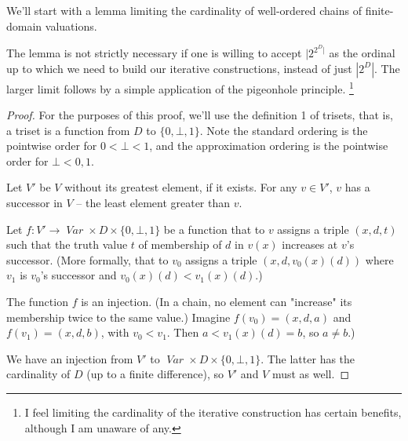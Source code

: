 \documentclass[oneside,12pt]{book}
\theoremstyle{definition}
\theoremstyle{remark}
\newcommand\var[1]{\mathop{\mathit{#1}}\nolimits}
\newcommand{\Var}{\var{Var}}
\begin{document}
We'll start with a lemma limiting the cardinality of well-ordered chains
of finite-domain valuations.

The lemma is not strictly necessary if one is willing to accept $|2^{2^D|}$
as the ordinal up to which we need to build our iterative constructions,
instead of just $|2^D|$. The larger limit follows by a simple application
of the pigeonhole principle.%
\footnote{I feel limiting the cardinality of the iterative construction
has certain benefits, although I am unaware of any.}

\wellOrderedChainsSmall*

\begin{proof}
  For the purposes of this proof, we'll use the definition 1 of trisets, that is,
  a triset is a function from $D$ to $\{0,\bot,1\}$. Note the standard
  ordering is the pointwise order for $0 < \bot < 1$, and the approximation
  ordering is the pointwise order for $\bot < 0,1$.
  
  Let $V'$ be $V$ without its greatest element, if it exists. For any $v \in V'$,
  $v$ has a successor in $V$ -- the least element greater than $v$.
  
  Let $f\colon V' \to \Var \times D \times \{0,\bot,1\}$ be a function
  that to $v$ assigns a triple $(x, d, t)$ such that the truth value $t$
  of membership of $d$ in $v(x)$ increases at $v$'s successor. (More formally,
  that to $v_0$ assigns a triple $(x, d, v_0(x)(d))$ where $v_1$ is $v_0$'s
  successor and $v_0(x)(d) < v_1(x)(d)$.)
  
  The function $f$ is an injection. (In a chain, no element can "increase" its
  membership twice to the same value.) Imagine $f(v_0) = (x, d, a)$ and
  $f(v_1) = (x, d, b)$, with $v_0 < v_1$. Then $a < v_1(x)(d) = b$, so $a \neq b$.)
  
  We have an injection from $V'$ to $\Var \times D \times \{0,\bot,1\}$.
  The latter has the cardinality of $D$ (up to a finite difference),
  so $V'$ and $V$ must as well.
\end{proof}

\pagebreak

\lemmaCoConst*
\end{document}
